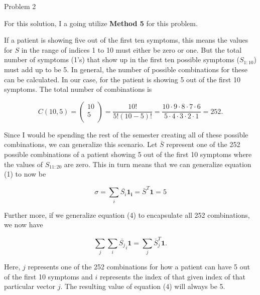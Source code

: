 \begin{problem}{Problem 2}
    \begin{Highlight}
        For this solution, I a going utilize \textbf{Method 5} for this problem. \vspace*{1em}

        If a patient is showing five out of the first ten symptoms, this means the values for $S$ in the range of indices 1 to 10 must either be zero or one. But the total number
        of symptoms (1's) that show up in the first ten possible symptoms ($S_{1:10}$) must add up to be 5. In general, the number of possible combinations for these can be calculated.
        In our case, for the patient is showing 5 out of the first 10 symptoms. The total number of combinations is

        \begin{equation}
            C(10,5) = 
            \begin{pmatrix}
                10 \\
                5 \\
            \end{pmatrix}
            = \frac{10!}{5!(10-5)!} = \frac{10\cdot9\cdot8\cdot7\cdot6}{5\cdot4\cdot3\cdot2\cdot1} = 252.
        \end{equation}

        Since I would be spending the rest of the semester creating all of these possible combinations, we can generalize this scenario. Let $\bar{S}$ represent one of the 252 possible
        combinations of a patient showing 5 out of the first 10 symptoms where the values of $S_{11:20}$ are zero. This in turn means that we can generalize equation (1) to now be

        \begin{equation}
            \sigma = \sum_{i} \bar{S_{i}}\mathbf{1_{i}} = \bar{S}^{T}\mathbf{1} = 5
        \end{equation}

        Further more, if we generalize equation (4) to encapsulate all 252 combinations, we now have

        \begin{equation}
            \sum_{j}\sum_{i} \bar{S_{j}}_{i}\mathbf{1} = \sum_{j} \bar{S}^{T}_{j}\mathbf{1}.
        \end{equation}

        Here, $j$ represents one of the 252 combinations for how a patient can have 5 out of the first 10 symptoms and $i$ represents the index of that given index of that particular vector
        $j$. The resulting value of equation (4) will always be 5.
    \end{Highlight}


\end{problem}
